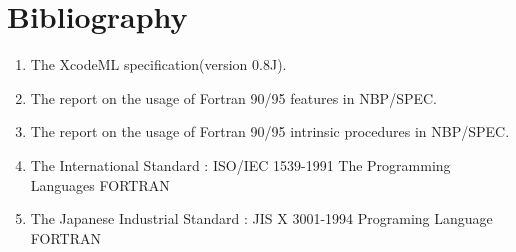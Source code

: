 \section{Bibliography}

\begin{enumerate}
\item The XcodeML specification(version 0.8J).
\item The report on the usage of Fortran 90/95 features in NBP/SPEC.
\item The report on the usage of Fortran 90/95 intrinsic procedures in NBP/SPEC.
\item The International Standard : ISO/IEC 1539-1991 The Programming Languages FORTRAN
\item The Japanese Industrial Standard : JIS X 3001-1994 Programing Language FORTRAN
\end{enumerate}

